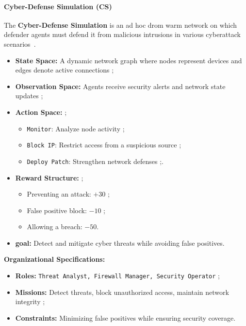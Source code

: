 \documentclass[journal]{IEEEtai}
\begin{document}
\paragraph{Cyber-Defense Simulation (CS)}
The \textbf{Cyber-Defense Simulation} is an ad hoc drom warm network on which defender agents must defend it from malicious intrusions in various cyberattack scenarios~\cite{Maxwell2021}. 

\begin{itemize}
    \item \textbf{State Space:} A dynamic network graph where nodes represent devices and edges denote active connections ;
    \item \textbf{Observation Space:} Agents receive security alerts and network state updates ;
    \item \textbf{Action Space:}  ;
    \begin{itemize}
        \item \texttt{Monitor}: Analyze node activity ;
        \item \texttt{Block IP}: Restrict access from a suspicious source ;
        \item \texttt{Deploy Patch}: Strengthen network defenses ;.
    \end{itemize}
    \item \textbf{Reward Structure:} ;
    \begin{itemize}
        \item Preventing an attack: $+30$ ;
        \item False positive block: $-10$ ;
        \item Allowing a breach: $-50$.
    \end{itemize}
    \item \textbf{goal:} Detect and mitigate cyber threats while avoiding false positives.
\end{itemize}

\textbf{Organizational Specifications:} 
\begin{itemize}
    \item \textbf{Roles:} \texttt{Threat Analyst, Firewall Manager, Security Operator} ;
    \item \textbf{Missions:} Detect threats, block unauthorized access, maintain network integrity ;
    \item \textbf{Constraints:} Minimizing false positives while ensuring security coverage.
\end{itemize}

\bigskip
\end{document}
